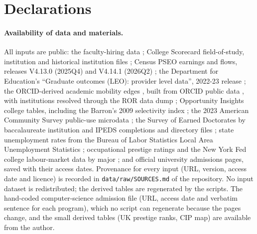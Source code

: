 \documentclass[11pt]{article}
\begin{document}
\section*{Declarations}
\sloppy

\paragraph{Availability of data and materials.} All inputs are public: the faculty-hiring data \citep{wapman2022data}; College Scorecard field-of-study,
institution and historical institution files \citep{scorecard}; Census PSEO earnings and flows, releases V4.13.0
(2025Q4) and V4.14.1 (2026Q2) \citep{pseo, pseo2026}; the Department for Education's ``Graduate outcomes (LEO):
provider level data'', 2022-23 release \citep{dfe_leo_provider}; the ORCID-derived academic mobility edges
\citep[version 20260419, doi:10.5281/zenodo.19651302;][]{li2026orcid}, built from ORCID public data
\citep{orcid}, with institutions resolved through the ROR data dump \citep[v2.8,
doi:10.5281/zenodo.20512981;][]{ror2026data}; Opportunity Insights college tables, including the Barron's 2009
selectivity index \citep{chetty2020income}; the 2023 American Community Survey public-use microdata
\citep{census_acs2023_pums}; the Survey of Earned Doctorates by baccalaureate institution \citep{ncses_sed_bacc}
and IPEDS completions and directory files \citep{nces_ipeds}; state unemployment rates from the Bureau of Labor
Statistics Local Area Unemployment Statistics \citep{fred_laus}; occupational prestige ratings
\citep{hughes2024occupational, condon2022prestige} and the New York Fed college labour-market data by major
\citep{nyfed2026labor}; and official university admissions pages, saved with their access dates. Provenance for
every input (URL, version, access date and licence) is recorded in \texttt{data/raw/SOURCES.md} of the repository.
No input dataset is redistributed; the derived tables are regenerated by the scripts. The hand-coded
computer-science admission file (URL, access date and verbatim sentence for each program), which no script can
regenerate because the pages change, and the small derived tables (UK prestige ranks, CIP map) are available from
the author.
\end{document}
